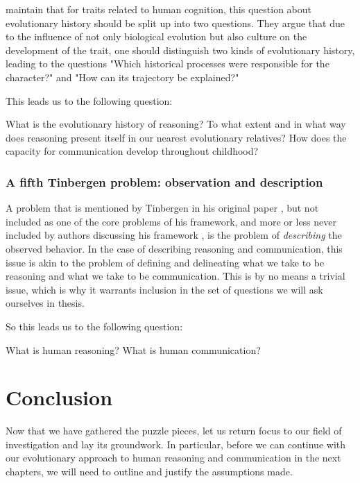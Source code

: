 \citet{BatesonLaland13} maintain that for traits related to human cognition, this question about evolutionary history should be split up into two questions. They argue that due to the influence of not only biological evolution but also culture on the development of the trait, one should distinguish two kinds of evolutionary history, leading to the questions "Which historical processes were responsible for the character?" and "How can its trajectory be explained?" \citep[p.~714]{BatesonLaland13}

This leads us to the following question:

\begin{exe}
    \ex
    \begin{xlist}
        \ex What is the evolutionary history of reasoning? To what extent and in what way does reasoning present itself in our nearest evolutionary relatives?
        \ex How does the capacity for communication develop throughout childhood?
    \end{xlist}
\end{exe}

\subsubsection{A fifth Tinbergen problem: observation and description}
A problem that is mentioned by Tinbergen in his original paper \citeyear{Tinbergen63}, but not included as one of the core problems of his framework, and more or less never included by authors discussing his framework \citep{LB02, Laland13, AllenBekoff95}, is the problem of \emph{describing} the observed behavior.
In the case of describing reasoning and communication, this issue is akin to the problem of defining and delineating what we take to be reasoning and what we take to be communication. This is by no means a trivial issue, which is why it warrants inclusion in the set of questions we will ask ourselves in thesis.

So this leads us to the following question:

\begin{exe}
    \ex
    \begin{xlist}
        \ex What is human reasoning?
        \ex What is human communication?
    \end{xlist}
\end{exe}

\section{Conclusion}
\label{sec:evo-conclusion}
Now that we have gathered the puzzle pieces, let us return focus to our field of investigation and lay its groundwork. In particular, before we can continue with our evolutionary approach to human reasoning and communication in the next chapters, we will need to outline and justify the assumptions made.

